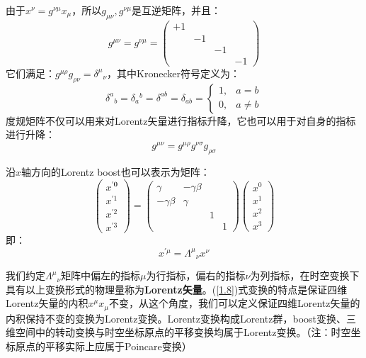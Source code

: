 \documentclass{book}
\begin{document}
由于$x^\nu=g^{\nu\mu}x_\mu$，所以$g_{\mu\nu},g^{\nu\mu}$是互逆矩阵，并且：
\begin{equation}
	g^{\mu\nu}=g^{\nu\mu}=\begin{pmatrix}+1\\&-1\\&&-1\\&&&-1\end{pmatrix}
\end{equation}
它们满足：$g^{\mu\rho}g_{\rho\nu}=\delta^\mu{}_\nu$，其中Kronecker符号定义为：
\begin{equation}
	\delta^a{}_b=\delta_a{}^b=\delta^{ab}=\delta_{ab}=\begin{cases}1,&a=b\\[2ex]0,&a\neq b\end{cases}
\end{equation}
度规矩阵不仅可以用来对Lorentz矢量进行指标升降，它也可以用于对自身的指标进行升降：
\begin{equation}
	g^{\mu\nu}=g^{\mu\rho}g^{\nu\sigma}g_{\rho\sigma}
\end{equation}

沿$x$轴方向的Lorentz boost也可以表示为矩阵：
\begin{equation}
	\begin{pmatrix}x^{\prime\mathbf{0}}\\x^{\prime1}\\x^{\prime2}\\x^{\prime3}\end{pmatrix}=\begin{pmatrix}\gamma&-\gamma\beta\\-\gamma\beta&\gamma\\&&1\\&&&1\end{pmatrix}\begin{pmatrix}x^0\\x^1\\x^2\\x^3\end{pmatrix}
\end{equation}
即：
\begin{equation}
	x^{\prime\mu}=\Lambda^{\mu}{}_{\nu}x^{\nu}
	\label{1.8}
\end{equation}

我们约定$\Lambda^{\mu}{}_{\nu}$矩阵中偏左的指标$\mu$为行指标，偏右的指标$\nu$为列指标，在时空变换下具有以上变换形式的物理量称为\textbf{Lorentz矢量}。(\ref{1.8})式变换的特点是保证四维Lorentz矢量的内积$x^\mu x_\mu$不变，从这个角度，我们可以定义保证四维Lorentz矢量的内积保持不变的变换为Lorentz变换。Lorentz变换构成Lorentz群，boost变换、三维空间中的转动变换与时空坐标原点的平移变换均属于Lorentz变换。（注：时空坐标原点的平移实际上应属于Poincare变换）
\end{document}
